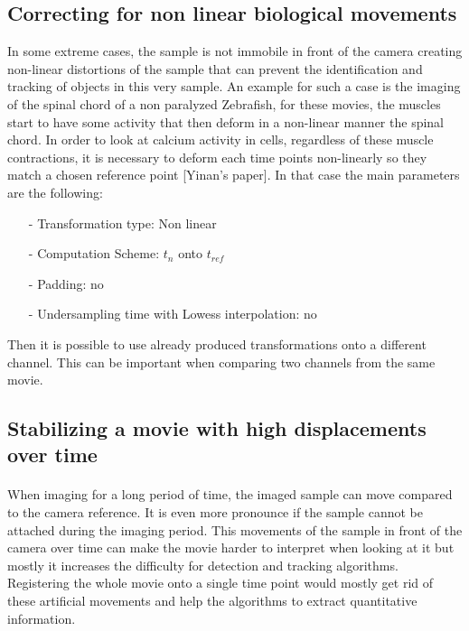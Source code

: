 \documentclass[10pt,a4paper]{article}
\begin{document}
\subsection{Correcting for non linear biological movements}
In some extreme cases, the sample is not immobile in front of the camera creating non-linear distortions of the sample that can prevent the identification and tracking of objects in this very sample. An example for such a case is the imaging of the spinal chord of a non paralyzed Zebrafish, for these movies, the muscles start to have some activity that then deform in a non-linear manner the spinal chord. In order to look at calcium activity in cells, regardless of these muscle contractions, it is necessary to deform each time points non-linearly so they match a chosen reference point [Yinan's paper]. In that case the main parameters are the following:
	\begin{itemize}
		\item[-] Transformation type: Non linear
		\item[-] Computation Scheme: $t_n$ onto $t_{ref}$
		\item[-] Padding: no
		\item[-] Undersampling time with Lowess interpolation: no
	\end{itemize}



Then it is possible to use already produced transformations onto a different channel. This can be important when comparing two channels from the same movie.
\subsection{Stabilizing a movie with high displacements over time}
\paragraph{}When imaging for a long period of time, the imaged sample can move compared to the camera reference. It is even more pronounce if the sample cannot be attached during the imaging period. This movements of the sample in front of the camera over time can make the movie harder to interpret when looking at it but mostly it increases the difficulty for detection and tracking algorithms. Registering the whole movie onto a single time point would mostly get rid of these artificial movements and help the algorithms to extract quantitative information.
\end{document}
